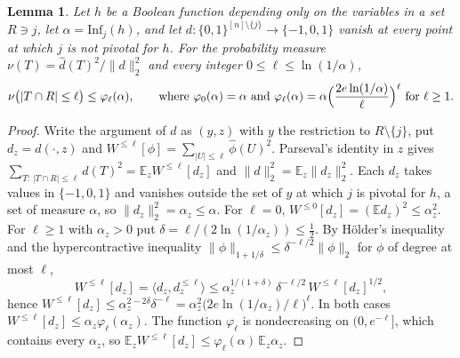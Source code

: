 \documentclass[11pt]{amsart}
\newtheorem{lemma}[theorem]{Lemma}
\theoremstyle{definition}
\theoremstyle{remark}
\newcommand{\E}{\mathbb{E}}
\newcommand{\Inf}{\mathrm{Inf}}
\newcommand{\bits}{\{0,1\}}
\begin{document}
\begin{lemma}\label{lem:level}
Let $h$ be a Boolean function depending only on the variables in a set $R\ni j$, let $\alpha=\Inf_j(h)$,
and let $d:\bits^{[n]\setminus\{j\}}\to\{-1,0,1\}$ vanish at every point at which $j$ is not pivotal for $h$. For the
probability measure $\nu(T)=\widehat d(T)^2/\|d\|_2^2$ and every integer $0\le\ell\le\ln(1/\alpha)$,
\[
\nu\bigl(|T\cap R|\le\ell\bigr)\le\varphi_\ell(\alpha),\qquad\text{where }\varphi_0(\alpha)=\alpha\text{ and }
\varphi_\ell(\alpha)=\alpha\Bigl(\frac{2e\ln(1/\alpha)}{\ell}\Bigr)^{\ell}\text{ for }\ell\ge1.
\]
\end{lemma}

\begin{proof}
Write the argument of $d$ as $(y,z)$ with $y$ the restriction to $R\setminus\{j\}$, put $d_z=d(\cdot,z)$ and
$W^{\le\ell}[\phi]=\sum_{|U|\le\ell}\widehat\phi(U)^2$. Parseval's identity in $z$ gives
$\sum_{T:\,|T\cap R|\le\ell}\widehat d(T)^2=\E_zW^{\le\ell}[d_z]$ and $\|d\|_2^2=\E_z\|d_z\|_2^2$. Each $d_z$ takes
values in $\{-1,0,1\}$ and vanishes outside the set of $y$ at which $j$ is pivotal for $h$, a set of measure
$\alpha$, so $\|d_z\|_2^2=\alpha_z\le\alpha$. For $\ell=0$, $W^{\le0}[d_z]=(\E d_z)^2\le\alpha_z^2$. For $\ell\ge1$ with
$\alpha_z>0$ put $\delta=\ell/(2\ln(1/\alpha_z))\le\frac12$. By H\"older's inequality and the hypercontractive
inequality $\|\phi\|_{1+1/\delta}\le\delta^{-\ell/2}\|\phi\|_2$ for $\phi$ of degree at most $\ell$,
\[
W^{\le\ell}[d_z]=\langle d_z,d_z^{\le\ell}\rangle\le\alpha_z^{1/(1+\delta)}\,\delta^{-\ell/2}\,W^{\le\ell}[d_z]^{1/2},
\]
hence $W^{\le\ell}[d_z]\le\alpha_z^{2-2\delta}\delta^{-\ell}=\alpha_z^2\bigl(2e\ln(1/\alpha_z)/\ell\bigr)^\ell$. In both
cases $W^{\le\ell}[d_z]\le\alpha_z\varphi_\ell(\alpha_z)$. The function $\varphi_\ell$ is nondecreasing on
$(0,e^{-\ell}]$, which contains every $\alpha_z$, so $\E_zW^{\le\ell}[d_z]\le\varphi_\ell(\alpha)\,\E_z\alpha_z$.
\end{proof}
\end{document}

